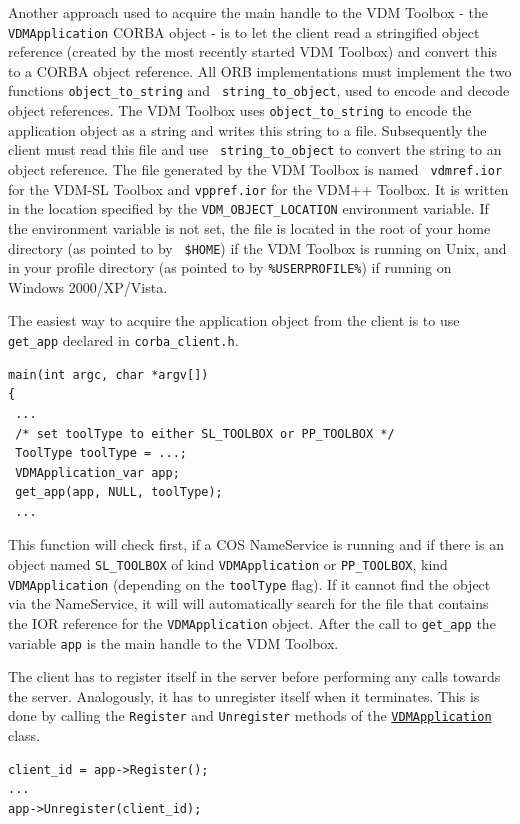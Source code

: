 \documentclass[\pformat,12pt]{article}
\newcommand{\VDMApplication}{\hyperlink{interface.VDMApplication}{VDMApplication}}
\begin{document}
Another approach used to acquire the main handle to the VDM Toolbox - the
{\tt VDMApplication} CORBA object - is to let the client read a stringified
object reference (created by the most recently started VDM Toolbox)
and convert this to a CORBA object reference. All ORB implementations
must implement the two functions {\tt object\_to\_string} and {\tt
  string\_to\_object}, used to encode and decode object references.
The VDM Toolbox uses {\tt object\_to\_string} to encode the
application object as a string and writes this string to a file.
Subsequently the client must read this file and use {\tt
  string\_to\_object} to convert the string to an object reference.
 The file generated by the VDM Toolbox is named {\tt
  vdmref.ior} for the VDM-SL Toolbox and {\tt vppref.ior} for
the VDM++ Toolbox. It is written in the location specified by the
{\tt VDM\_OBJECT\_LOCATION} environment variable.
If the environment variable is not set, the file is 
located in the root of your home directory (as pointed to by {\tt
  \$HOME}) if the VDM Toolbox is running on Unix, and in your profile
directory (as pointed to by {\tt \%USERPROFILE\%}) if running on Windows 2000/XP/Vista.

The easiest way to acquire the application object from the client is
to use {\tt get\_app} declared in {\tt corba\_client.h}.

\begin{verbatim}
main(int argc, char *argv[])
{
 ...
 /* set toolType to either SL_TOOLBOX or PP_TOOLBOX */
 ToolType toolType = ...;
 VDMApplication_var app;
 get_app(app, NULL, toolType);
 ...
\end{verbatim}

This function will check first, if a COS NameService is running
and if there is an object named {\tt SL\_TOOLBOX} of kind {\tt VDMApplication}
or {\tt PP\_TOOLBOX}, kind {\tt VDMApplication} (depending on the {\tt toolType} flag).
If it cannot find the object via the NameService, it will
will automatically search for the file that
contains the IOR reference for the {\tt VDMApplication} object. 
After the call to {\tt get\_app} the variable
{\tt app} is the main handle to the VDM Toolbox.

The client has to register itself in the server before performing any
calls towards the server. Analogously, it has to unregister itself
when it terminates. This is done by calling the  {\tt Register} and
{\tt Unregister} methods of the {\tt \VDMApplication} class. 

\begin{verbatim}
client_id = app->Register();
...
app->Unregister(client_id);
\end{verbatim}
\end{document}
